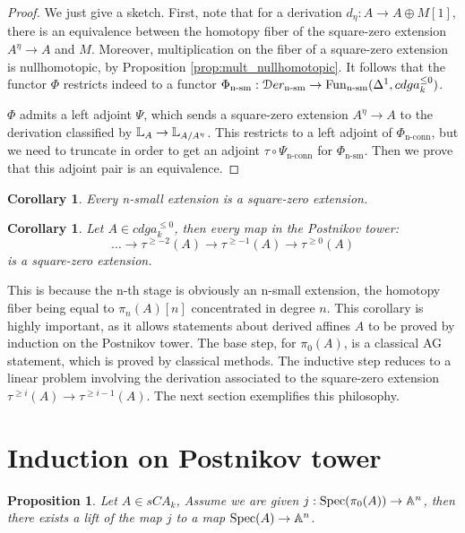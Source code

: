 \documentclass[10pt,a4paper,reqno,oneside]{book} %
\theoremstyle{plain}
\newtheorem{prop}[thm]{Proposition}
\newtheorem{cor}[thm]{Corollary}
\theoremstyle{definition}
\theoremstyle{remark}
\numberwithin{equation}{section}
\begin{document}
\begin{proof}
We just give a sketch. First, note that for a derivation $d_\eta : A \to A \oplus M[1]$, there is an equivalence
between the homotopy fiber of the square-zero extension $A^{\eta} \to A$ and $M$. Moreover, multiplication on
the fiber of a square-zero extension is nullhomotopic, by Proposition \ref{prop:mult_nullhomotopic}.
 It follows that the functor $\Phi$ restricts indeed to a functor
$\Phi_{\text{n-sm}} : \mathcal D er_{\text{n-sm}} \to \operatorname{Fun}_{\text{n-sm}}(\Delta^1, cdga_k^{\leq 0})$. 

$\Phi$ admits a left adjoint $\Psi$, which sends a square-zero extension $A^{\eta} \to A$ to the derivation classified
by $\mathbb L_A \to \mathbb L_{A/A^{\eta}}$. This restricts to a left adjoint of $\Phi_{\text{n-conn}}$, but we need to truncate in
order to get an adjoint $\tau \circ \Psi_{\text{n-conn}}$ for $\Phi_{\text{n-sm}}$. Then we prove that this adjoint pair
is an equivalence.
\end{proof}


\begin{cor}
Every n-small extension is a square-zero extension.
\end{cor}

\begin{cor}
Let $A \in cdga_k^{\leq 0}$, then every map in the Postnikov tower:
\[	\dots \to \tau^{\geq -2}(A) \to \tau^{\geq -1}(A) \to \tau^{\geq 0} (A) 	\]
is a square-zero extension.
\end{cor}

This is because the n-th stage is obviously an n-small extension, the homotopy fiber being equal to $\pi_{n}(A)[n]$ 
concentrated in degree $n$.  This corollary is highly important, as it allows statements about derived affines $A$ to be proved
by induction on the Postnikov tower. The base step, for $\pi_0(A)$, is a classical AG statement, which is proved by classical
methods. The inductive step reduces to a linear problem involving the derivation
associated to the square-zero extension $\tau^{\geq i}(A) \to \tau^{\geq i-1}(A)$. The next section exemplifies this
philosophy.




\section{Induction on Postnikov tower}
\label{sect:sq0_induction}

\begin{prop}
Let $A\in sCA_{k}$, Assume we are given $j:\operatorname{Spec}(\pi_{0}(A))\to \mathbb{A}^{n}$, then there exists a lift 
of the map $j$ to a map $\operatorname{Spec}(A)\rightarrow \mathbb{A}^{n}$.
\end{prop}
\end{document}
